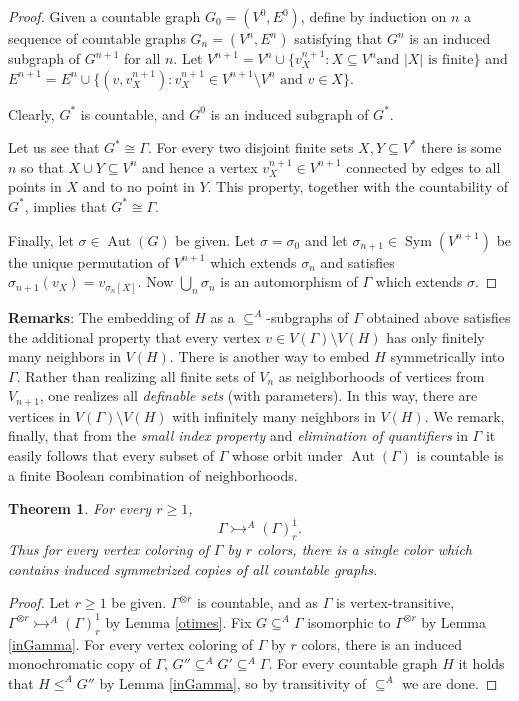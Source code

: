 \documentclass[11pt]{amsart}
\newcommand{\ars}{\rightarrowtail}
\newcommand{\sm}{\setminus}
\newcommand{\su}{\subseteq}
\newcommand{\aut}{\operatorname{Aut}}
\newcommand{\sym}{\operatorname{Sym}}
\newtheorem{theorem}{Theorem}[section]
\begin{document}
\begin{proof}
Given a countable graph $G_0=(V^0, E^0)$, define by induction on $n$
a sequence of countable graphs
$G_{n}=(V^{n},E^{n})$ satisfying that $G^n$ is an induced subgraph of
$G^{n+1}$ for all $n$.
Let $V^{n+1}=V^n\cup\{v^{n+1}_X: X\su V^n \text{
  and } |X| \text{ is
  finite}\}$ and $E^{n+1}=E^n\cup\{(v,v^{n+1}_X):v^{n+1}_X\in
V^{n+1}\sm V^n \text{ and } v\in X\}$.

Clearly, $G^*$
is countable, and $G^0$ is an induced subgraph of $G^*$.

Let us see that $G^*\cong\Gamma$. For every two disjoint finite sets
$X,Y\su V^*$ there is some $n$ so that $X\cup Y\su V^n$ and hence
a vertex $v_X^{n+1}\in V^{n+1}$ connected by edges to all points
in $X$ and to no point in $Y$. This property, together with the
countability of $G^*$, implies that $G^*\cong\Gamma$.

Finally, let $\sigma\in \aut(G)$ be given. Let $\sigma=\sigma_0$
and let $\sigma_{n+1}\in \sym(V^{n+1})$ be the unique permutation
of $V^{n+1}$ which extends $\sigma_n$ and satisfies
$\sigma_{n+1}(v_X)=v_{\sigma_n[X]}$. Now $\bigcup_n \sigma_n$ is
an automorphism of $\Gamma$ which extends $\sigma$.
\end{proof}

\noindent \textbf{Remarks}: The embedding of $H$ as a
$\su^A$-subgraphs
of $\Gamma$ obtained above satisfies the additional
property that every vertex $v\in V(\Gamma)\sm V(H)$ has only finitely
many neighbors in $V(H)$. There is another way to embed $H$
symmetrically into $\Gamma$. Rather than realizing all finite sets of
$V_n$ as neighborhoods of vertices from $V_{n+1}$, one realizes all
\emph{definable sets} (with parameters). In this way, there are
vertices in $V(\Gamma)\sm V(H)$ with infinitely many neighbors in
$V(H)$.  We remark, finally, that from the \emph{small index property}
\cite{HHLS} and \emph{elimination of quantifiers} in $\Gamma$ it
easily follows that every subset of $\Gamma$ whose orbit under
$\aut(\Gamma)$ is countable is a finite Boolean combination of
neighborhoods.


\begin{theorem}\label{Gamma}
 For every $r\ge 1$,
\[\Gamma \ars^A(\Gamma)^1_r.\]
Thus for every vertex coloring of $\Gamma$ by $r$
  colors, there is a single color which contains induced symmetrized
  copies of all countable graphs.
\end{theorem}

\begin{proof}
  Let $r\ge 1$ be given. $\Gamma^{\otimes r}$ is countable, and as
  $\Gamma$ is vertex-transitive, $\Gamma^{\otimes
r}\ars^A(\Gamma)^1_r$
  by Lemma \ref{otimes}.  Fix $G\su^A\Gamma$ isomorphic to
  $\Gamma^{\otimes r}$ by Lemma \ref{inGamma}. For every vertex
  coloring of $\Gamma$ by $r$ colors, there is an induced
  monochromatic  copy of $\Gamma$,  $G''\su^A G'\su^A \Gamma$. For
every
  countable graph $H$ it holds that $H\le^A G''$ by Lemma
  \ref{inGamma}, so by transitivity of $\su^A$ we are done.
\end{proof}
\end{document}
